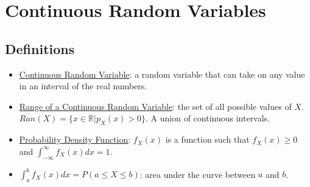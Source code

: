 \documentclass[12pt]{article}
\begin{document}
    \section{Continuous Random Variables}
        \subsection{Definitions}
            \begin{itemize}
                \item \underline{Continuous Random Variable}: a random variable that can take on any value in an interval of the real numbers.
                \item \underline{Range of a Continuous Random Variable}: the set of all possible values of $X$. $Ran(X) = \{x \in \mathbb{R} | p_X(x) > 0\}$. A union of continuous intervals.
                \item \underline{Probability Density Function}: $f_X(x)$ is a function such that $f_X(x) \geq 0$ and $\int_{-\infty}^{\infty} f_X(x) dx = 1$.
                \item $\int_a^b f_X(x) dx = P(a \leq X \leq b)$: area under the curve between $a$ and $b$.
            \end{itemize}
\end{document}
